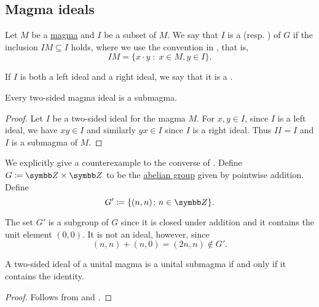 \subsection{Magma ideals}\label{sec:magma_ideals}

\begin{definition}\label{def:magma_ideal}
  Let \( M \) be a \hyperref[def:magma/magma]{magma} and \( I \) be a subset of \( M \). We say that \( I \) is a  (resp. ) of \( G \) if the inclusion \( IM \subseteq I \) holds, where we use the convention in , that is,
  \begin{equation*}
    IM = \{ x \cdot y \;\colon\; x \in M, y \in I \}.
  \end{equation*}

  If \( I \) is both a left ideal and a right ideal, we say that it is a .
\end{definition}

\begin{proposition}\label{thm:magma_ideal_is_submagma}
  Every two-sided magma ideal is a submagma.
\end{proposition}
\begin{proof}
  Let \( I \) be a two-sided ideal for the magma \( M \). For \( x, y \in I \), since \( I \) is a left ideal, we have \( xy \in I \) and similarly \( yx \in I \) since \( I \) is a right ideal. Thus \( II = I \) and \( I \) is a submagma of \( M \).
\end{proof}

\begin{example}\label{ex:subgroup_is_not_ideal}
  We explicitly give a counterexample to the converse of . Define \( G \coloneqq \BZ \times \BZ \) to be the \hyperref[def:abelian_group]{abelian group} given by pointwise addition. Define
  \begin{equation*}
    G' \coloneqq \{ (n, n) \colon n \in \BZ \}.
  \end{equation*}

  The set \( G' \) is a subgroup of \( G \) since it is closed under addition and it contains the unit element \( (0, 0) \). It is not an ideal, however, since
  \begin{equation*}
    (n, n) + (n, 0) = (2n, n) \not\in G'.
  \end{equation*}
\end{example}

\begin{proposition}\label{thm:unital_magma_ideal_is_submagma_iff_contains_identity}
  A two-sided ideal of a unital magma is a unital submagma if and only if it contains the identity.
\end{proposition}
\begin{proof}
  Follows from  and .
\end{proof}

